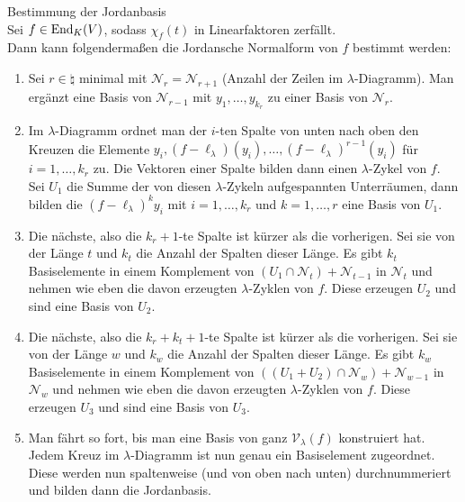 \begin{Prozedur}{Bestimmung der Jordanbasis} \\
    Sei $f \in \operatorname{End}_K(V)$, sodass $\chi_f(t)$ in Linearfaktoren zerfällt. \\
    Dann kann folgendermaßen die Jordansche Normalform von
    $f$ bestimmt werden:
    \begin{enumerate}
        \item
        Sei $r \in \natural$ minimal mit $\mathcal{N}_r = \mathcal{N}_{r+1}$
        (Anzahl der Zeilen im $\lambda$-Diagramm).
        Man ergänzt eine Basis von $\mathcal{N}_{r-1}$ mit
        $y_1, \dotsc, y_{k_r}$  zu einer Basis von $\mathcal{N}_r$.
        
        \item
        Im $\lambda$-Diagramm ordnet man der $i$-ten Spalte von unten nach
        oben den Kreuzen die Elemente
        $y_i, (f - \ell_\lambda)(y_i), \dotsc, (f - \ell_\lambda)^{r-1}(y_i)$
        für $i = 1, \dotsc, k_r$ zu.
        Die Vektoren einer Spalte bilden dann einen $\lambda$-Zykel von $f$.
        Sei $U_1$ die Summe der von diesen $\lambda$-Zykeln aufgespannten
        Unterräumen, dann bilden die $(f - \ell_\lambda)^k y_i$
        mit $i = 1, \dotsc, k_r$ und $k = 1, \dotsc, r$ eine Basis von $U_1$.
        
        \item
        Die nächste, also die $k_r + 1$-te Spalte ist kürzer als die
        vorherigen.
        Sei sie von der Länge $t$ und $k_t$ die Anzahl der Spalten dieser
        Länge.
        Es gibt $k_t$ Basiselemente in einem Komplement von
        $(U_1 \cap \mathcal{N}_t) + \mathcal{N}_{t-1}$ in $\mathcal{N}_t$
        und nehmen wie eben die davon erzeugten $\lambda$-Zyklen von $f$.
        Diese erzeugen $U_2$ und sind eine Basis von $U_2$.
        
        \item
        Die nächste, also die $k_r + k_t + 1$-te Spalte ist kürzer als die
        vorherigen.
        Sei sie von der Länge $w$ und $k_w$ die Anzahl der Spalten dieser
        Länge.
        Es gibt $k_w$ Basiselemente in einem Komplement
        von $((U_1 + U_2) \cap \mathcal{N}_w) + \mathcal{N}_{w-1}$
        in $\mathcal{N}_w$
        und nehmen wie eben die davon erzeugten $\lambda$-Zyklen von $f$.
        Diese erzeugen $U_3$ und sind eine Basis von $U_3$.
        
        \item
        Man fährt so fort, bis man eine Basis von ganz
        $\mathcal{V}_\lambda(f)$ konstruiert hat.
        Jedem Kreuz im $\lambda$-Diagramm ist nun genau ein Basiselement
        zugeordnet.
        Diese werden nun spaltenweise (und von oben nach unten)
        durchnummeriert und bilden dann die Jordanbasis.
    \end{enumerate}
\end{Prozedur}

